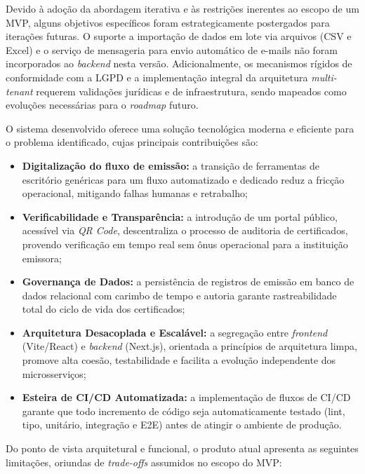 Devido à adoção da abordagem iterativa e às restrições inerentes ao escopo de um MVP, alguns objetivos específicos foram estrategicamente postergados para iterações futuras. O suporte a importação de dados em lote via arquivos (CSV e Excel) e o serviço de mensageria para envio automático de e-mails não foram incorporados ao \textit{backend} nesta versão. Adicionalmente, os mecanismos rígidos de conformidade com a LGPD e a implementação integral da arquitetura \textit{multi-tenant} requerem validações jurídicas e de infraestrutura, sendo mapeados como evoluções necessárias para o \textit{roadmap} futuro.


O sistema desenvolvido oferece uma solução tecnológica moderna e eficiente para o problema identificado, cujas principais contribuições são:

\begin{itemize}
    \item \textbf{Digitalização do fluxo de emissão:} a transição de ferramentas de escritório genéricas para um fluxo automatizado e dedicado reduz a fricção operacional, mitigando falhas humanas e retrabalho;
    \item \textbf{Verificabilidade e Transparência:} a introdução de um portal público, acessível via \textit{QR Code}, descentraliza o processo de auditoria de certificados, provendo verificação em tempo real sem ônus operacional para a instituição emissora;
    \item \textbf{Governança de Dados:} a persistência de registros de emissão em banco de dados relacional com carimbo de tempo e autoria garante rastreabilidade total do ciclo de vida dos certificados;
    \item \textbf{Arquitetura Desacoplada e Escalável:} a segregação entre \textit{frontend} (Vite/React) e \textit{backend} (Next.js), orientada a princípios de arquitetura limpa, promove alta coesão, testabilidade e facilita a evolução independente dos microsserviços;
    \item \textbf{Esteira de CI/CD Automatizada:} a implementação de fluxos de CI/CD garante que todo incremento de código seja automaticamente testado (lint, tipo, unitário, integração e E2E) antes de atingir o ambiente de produção.
\end{itemize}


Do ponto de vista arquitetural e funcional, o produto atual apresenta as seguintes limitações, oriundas de \textit{trade-offs} assumidos no escopo do MVP:

